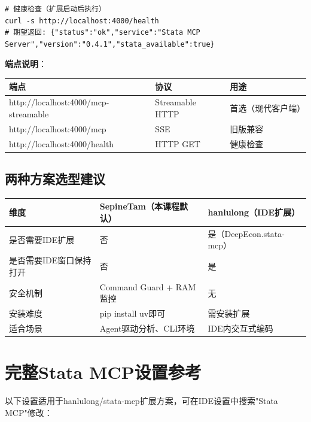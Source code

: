 \begin{lstlisting}[style=shell]
# 健康检查（扩展启动后执行）
curl -s http://localhost:4000/health
# 期望返回: {"status":"ok","service":"Stata MCP Server","version":"0.4.1","stata_available":true}
\end{lstlisting}

\textbf{端点说明}：

\begin{table}[H]
\centering
\begin{tabular}{lll}
\toprule
\textbf{端点} & \textbf{协议} & \textbf{用途} \\
\midrule
http://localhost:4000/mcp-streamable & Streamable HTTP & 首选（现代客户端） \\
http://localhost:4000/mcp & SSE & 旧版兼容 \\
http://localhost:4000/health & HTTP GET & 健康检查 \\
\bottomrule
\end{tabular}
\end{table}

\subsection{两种方案选型建议}

\begin{table}[H]
\centering
\begin{tabular}{lp{5.5cm}p{5.5cm}}
\toprule
\textbf{维度} & \textbf{SepineTam（本课程默认）} & \textbf{hanlulong（IDE扩展）} \\
\midrule
是否需要IDE扩展 & 否 & 是（DeepEcon.stata-mcp） \\
是否需要IDE窗口保持打开 & 否 & 是 \\
安全机制 & Command Guard + RAM监控 & 无 \\
安装难度 & pip install uv即可 & 需安装扩展 \\
适合场景 & Agent驱动分析、CLI环境 & IDE内交互式编码 \\
\bottomrule
\end{tabular}
\end{table}

\section{完整Stata MCP设置参考}

以下设置适用于hanlulong/stata-mcp扩展方案，可在IDE设置中搜索"Stata MCP"修改：

